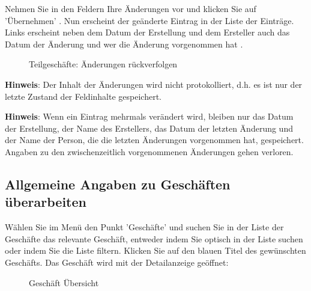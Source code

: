 Nehmen Sie in den Feldern Ihre Änderungen vor und klicken Sie auf 'Übernehmen' . Nun erscheint der geänderte Eintrag in der Liste der Einträge. Links erscheint neben dem Datum der Erstellung und dem Ersteller auch das Datum der Änderung und wer die Änderung vorgenommen hat .

\begin{figure}[H]
\caption{Teilgeschäfte: Änderungen rückverfolgen}
\end{figure}

\textbf{Hinweis}: Der Inhalt der Änderungen wird nicht protokolliert, d.h. es ist nur der letzte Zustand der Feldinhalte gespeichert.

\vspace{\baselineskip}

\textbf{Hinweis}: Wenn ein Eintrag mehrmals verändert wird, bleiben nur das Datum der Erstellung, der Name des Erstellers, das Datum der letzten Änderung und der Name der Person, die die letzten Änderungen vorgenommen hat, gespeichert. Angaben zu den zwischenzeitlich vorgenommenen Änderungen gehen verloren.

\subsection{Allgemeine Angaben zu Geschäften überarbeiten}

Wählen Sie im Menü den Punkt 'Geschäfte' und suchen Sie in der Liste der Geschäfte das relevante Geschäft, entweder indem Sie optisch in der Liste suchen oder indem Sie die Liste filtern. Klicken Sie auf den blauen Titel des gewünschten Geschäfts. Das Geschäft wird mit der Detailanzeige geöffnet:

\begin{figure}[H]
\caption{Geschäft Übersicht}
\end{figure}

